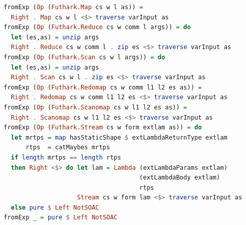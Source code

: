 \documentclass[11pt,bibliography=totocnumbered]{article}
\begin{document}
\begin{lstlisting}[language=Haskell,caption=Implementing scanomap as SOAC]
fromExp (Op (Futhark.Map cs w l as)) =
  Right . Map cs w l <$> traverse varInput as
fromExp (Op (Futhark.Reduce cs w comm l args)) = do
  let (es,as) = unzip args
  Right . Reduce cs w comm l . zip es <$> traverse varInput as
fromExp (Op (Futhark.Scan cs w l args)) = do
  let (es,as) = unzip args
  Right . Scan cs w l . zip es <$> traverse varInput as
fromExp (Op (Futhark.Redomap cs w comm l1 l2 es as)) =
  Right . Redomap cs w comm l1 l2 es <$> traverse varInput as
fromExp (Op (Futhark.Scanomap cs w l1 l2 es as)) =
  Right . Scanomap cs w l1 l2 es <$> traverse varInput as
fromExp (Op (Futhark.Stream cs w form extlam as)) = do
  let mrtps = map hasStaticShape $ extLambdaReturnType extlam
      rtps  = catMaybes mrtps
  if length mrtps == length rtps
  then Right <$> do let lam = Lambda (extLambdaParams extlam)
                                     (extLambdaBody extlam)
                                     rtps
                    Stream cs w form lam <$> traverse varInput as
  else pure $ Left NotSOAC
fromExp _ = pure $ Left NotSOAC
\end{lstlisting}

\newpage
\end{document}

